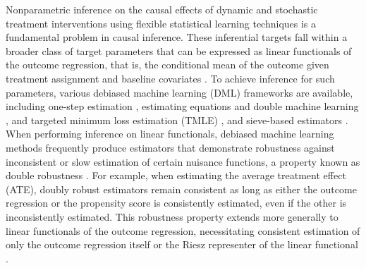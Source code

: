 \documentclass[11pt]{article}
\theoremstyle{plain}
\begin{document}
 Nonparametric inference on the causal effects of dynamic and stochastic treatment interventions using flexible statistical learning techniques is a fundamental problem in causal inference. These inferential targets fall within a broader class of target parameters that can be expressed as linear functionals of the outcome regression, that is, the conditional mean of the outcome given treatment assignment and baseline covariates \citep{chernozhukov2018double, rotnitzky2021characterization, hirshberg2021augmented}. To achieve inference for such parameters, various debiased machine learning (DML) frameworks are available, including one-step estimation \citep{pfanzagl1985contributions, bickel1993efficient}, estimating equations and double machine learning \citep{robins1995analysis, robinsCausal, vanderlaanunified, DoubleML}, and targeted minimum loss estimation (TMLE) \citep{van2006targeted, vanderLaanRose2011}, and sieve-based estimators \citep{qiu2021universal, cho2024kernel}. When performing inference on linear functionals, debiased machine learning methods frequently produce estimators that demonstrate robustness against inconsistent or slow estimation of certain nuisance functions, a property known as double robustness \citep{bang2005doubly, smucler2019unifying}. For example, when estimating the average treatment effect (ATE),  doubly robust estimators remain consistent as long as either the outcome regression or the propensity score is consistently estimated, even if the other is inconsistently estimated. This robustness property extends more generally to linear functionals of the outcome regression, necessitating consistent estimation of only the outcome regression itself or the Riesz representer of the linear functional \citep{chernozhukov2018double, rotnitzky2021characterization}.
\end{document}
